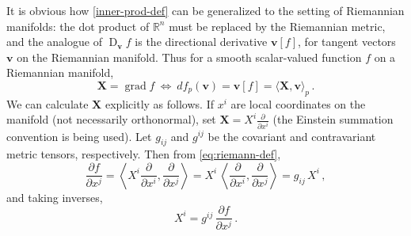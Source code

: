 \documentclass[12pt]{article}
\newcommand{\real}{\mathbb{R}}
\DeclareMathOperator{\D}{D}
\newcommand{\vv}{\mathbf{v}}
\newcommand{\vX}{\mathbf{X}}
\newcommand{\grad}{\operatorname{grad}}
\begin{document}
It is obvious how \eqref{inner-prod-def}
can be generalized to the setting of Riemannian manifolds:
the dot product of $\real^n$ must be replaced
by the Riemannian metric, and the analogue
of $\D_\vv f$ is the directional derivative $\vv[f]$, for tangent vectors $\vv$ on the Riemannian manifold.
Thus for a smooth scalar-valued function $f$ on a Riemannian manifold,
\begin{equation}\label{eq:riemann-def}
\vX = \grad f  \: \Leftrightarrow \: df_p(\vv) = \vv[f] = \langle \vX, \vv \rangle_p\,.
\end{equation}
We can calculate $\vX$ explicitly as follows.
If $x^i$ are local coordinates on the manifold (not necessarily orthonormal),
set $\vX = X^i \frac{\partial}{\partial x^i}$ (the Einstein summation convention is being used).
Let $ g_{ij}$ and $ g^{ij}$ be the covariant and contravariant metric tensors, respectively.
Then from \eqref{eq:riemann-def},
\[
\frac{\partial f}{\partial x^j} = \left\langle X^i 
\frac{\partial}{\partial x^i}, \frac{\partial}{\partial x^j} \right\rangle
= X^i \, \left\langle \frac{\partial}{\partial x^i}, \frac{\partial}{\partial x^j} \right\rangle 
=  g_{ij} \, X^i\,,
\]
and taking inverses,
\begin{equation}\label{eq:gendef}
X^i = g^{ij} \, \frac{\partial f}{\partial x^j}\,.
\end{equation}
\end{document}
